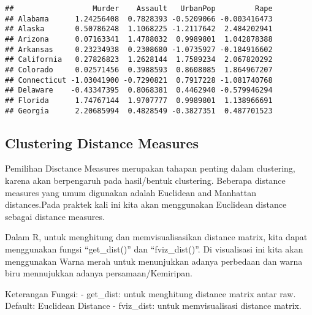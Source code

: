 \documentclass[]{article}
\newenvironment{Shaded}{\begin{snugshade}}{\end{snugshade}}
\newcommand{\CommentTok}[1]{\textcolor[rgb]{0.56,0.35,0.01}{\textit{#1}}}
\newcommand{\DataTypeTok}[1]{\textcolor[rgb]{0.13,0.29,0.53}{#1}}
\newcommand{\KeywordTok}[1]{\textcolor[rgb]{0.13,0.29,0.53}{\textbf{#1}}}
\newcommand{\NormalTok}[1]{#1}
\newcommand{\StringTok}[1]{\textcolor[rgb]{0.31,0.60,0.02}{#1}}
\begin{document}
\begin{verbatim}
##                  Murder    Assault   UrbanPop         Rape
## Alabama      1.24256408  0.7828393 -0.5209066 -0.003416473
## Alaska       0.50786248  1.1068225 -1.2117642  2.484202941
## Arizona      0.07163341  1.4788032  0.9989801  1.042878388
## Arkansas     0.23234938  0.2308680 -1.0735927 -0.184916602
## California   0.27826823  1.2628144  1.7589234  2.067820292
## Colorado     0.02571456  0.3988593  0.8608085  1.864967207
## Connecticut -1.03041900 -0.7290821  0.7917228 -1.081740768
## Delaware    -0.43347395  0.8068381  0.4462940 -0.579946294
## Florida      1.74767144  1.9707777  0.9989801  1.138966691
## Georgia      2.20685994  0.4828549 -0.3827351  0.487701523
\end{verbatim}

\hypertarget{clustering-distance-measures}{%
\subsection{Clustering Distance
Measures}\label{clustering-distance-measures}}

Pemilihan Disctance Measures merupakan tahapan penting dalam clustering,
karena akan berpengaruh pada hasil/bentuk clustering. Beberapa distance
measures yang umum digunakan adalah Euclidean and Manhattan
distances.Pada praktek kali ini kita akan menggunakan Euclidean distance
sebagai distance measures.

Dalam R, untuk menghitung dan memvisualisasikan distance matrix, kita
dapat menggunakan fungsi ``get\_dist()'' dan ``fviz\_dist()''. Di
visualisasi ini kita akan menggunakan Warna merah untuk menunjukkan
adanya perbedaan dan warna biru mennujukkan adanya persamaan/Kemiripan.

Keterangan Fungsi: - get\_dist: untuk menghitung distance matrix antar
raw. Default: Euclidean Distance - fviz\_dist: untuk memvisualisasi
distance matrix.

\begin{Shaded}
\end{Shaded}
\end{document}
